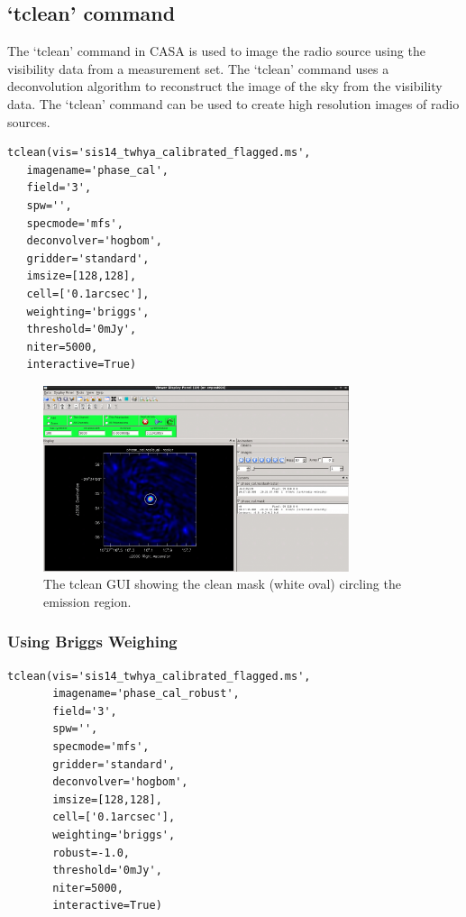 \clearpage

\subsection{`tclean' command}

The `tclean' command in CASA is used to image the radio source using the visibility data from a measurement set. The `tclean' command uses a deconvolution algorithm to reconstruct the image of the sky from the visibility data. The `tclean' command can be used to create high resolution images of radio sources.

\vspace{15mm}

\begin{lstlisting}[style=casa-python]
tclean(vis='sis14_twhya_calibrated_flagged.ms',
   imagename='phase_cal',
   field='3',
   spw='',
   specmode='mfs',
   deconvolver='hogbom',
   gridder='standard',
   imsize=[128,128],
   cell=['0.1arcsec'],
   weighting='briggs',
   threshold='0mJy',
   niter=5000,
   interactive=True)
\end{lstlisting}

\begin{figure}[H]
	\centering
	\includegraphics[width=0.8\textwidth]{Images/tclean.png}
	\caption{The tclean GUI showing the clean mask (white oval) circling the emission region.}
\end{figure}

\clearpage

\subsubsection{Using Briggs Weighing}

\begin{lstlisting}[style=casa-python]
tclean(vis='sis14_twhya_calibrated_flagged.ms',
       imagename='phase_cal_robust',
       field='3',
       spw='',
       specmode='mfs',
       gridder='standard',
       deconvolver='hogbom',
       imsize=[128,128],
       cell=['0.1arcsec'],
       weighting='briggs',
       robust=-1.0,
       threshold='0mJy',
       niter=5000,
       interactive=True)
\end{lstlisting}

